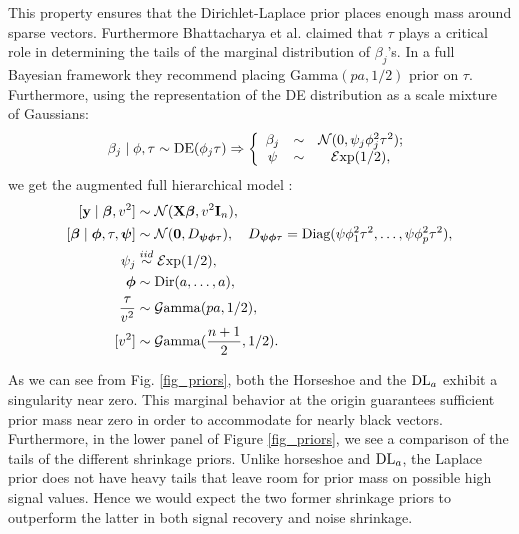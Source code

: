 \documentclass[chapters]{uamaththesis}
\begin{document}
This property ensures that the Dirichlet-Laplace prior places enough mass around sparse vectors. Furthermore Bhattacharya et al. claimed that $\tau$ plays a critical role in determining the tails of the marginal distribution of $\beta_j$'s. In a full Bayesian framework they recommend placing \rm{Gamma}$(pa ,1/2)$ prior on $\tau$. Furthermore, using the representation of the \rm{DE} distribution as a scale mixture of Gaussians: \[ \beta_j \mid \phi , \tau \sim \text{\rm{DE}}(\phi_j \tau) \Rightarrow \left\{ \begin{array}{ccc}
\beta_j & \sim & \mathcal{N}(0 , \psi_j\phi^2_j\tau^2); \\
\psi & \sim & \mathcal{E}\mathrm{xp}(1/2),
\end{array} \right. \] we get the augmented full hierarchical model :
\begin{align} \label{sq_dl_h}
[ \y \mid \bbeta, v^2 ] & \sim \NormRV(\X \bbeta, v^2 \I_n), \\
[\bbeta \mid \bphi, \tau , \bpsi ] & \sim \NormRV(\0, D_{\bpsi \bphi \tau}), \quad D_{\bpsi \bphi \tau} = \text{Diag}(\psi\phi_1^2\tau^2, \ldots, \psi\phi_p^2\tau^2), \\
\psi_j & \stackrel{iid}{\sim} \mathcal{E}\mathrm{xp}(1/2), \\
\bphi & \sim \text{\rm{Dir}}(a, \ldots ,a), \\
\frac{\tau}{v^2} & \sim \mathcal{G}\mathrm{amma}(pa , 1/2), \\
[v^2] & \sim \mathcal{G}\mathrm{amma}(\frac{n+1}{2} , 1/2).  
\end{align}

As we can see from Fig. \ref{fig_priors}, both the Horseshoe and the $\text{\rm{DL}}_a$ exhibit a singularity near zero. This marginal behavior at the origin guarantees sufficient prior mass near zero in order to accommodate for nearly black vectors. Furthermore, in the lower panel of Figure \ref{fig_priors}, we see a comparison of the tails of the different shrinkage priors. Unlike horseshoe and $\text{\rm{DL}}_a$, the Laplace prior does not have heavy tails that leave room for prior mass on possible high signal values. Hence we would expect the two former shrinkage priors to outperform the latter in both signal recovery and noise shrinkage. 
\end{document}
